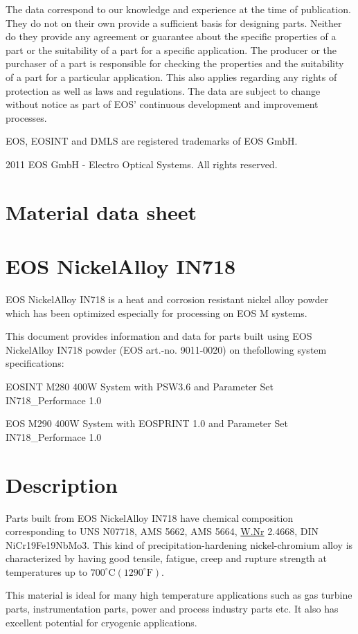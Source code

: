\documentclass[10pt]{article}
\begin{document}
The data correspond to our knowledge and experience at the time of publication. They do not on their own provide a sufficient basis for designing parts. Neither do they provide any agreement or guarantee about the specific properties of a part or the suitability of a part for a specific application. The producer or the purchaser of a part is responsible for checking the properties and the suitability of a part for a particular application. This also applies regarding any rights of protection as well as laws and regulations. The data are subject to change without notice as part of EOS' continuous development and improvement processes.

EOS, EOSINT and DMLS are registered trademarks of EOS GmbH.

2011 EOS GmbH - Electro Optical Systems. All rights reserved.

\section*{Material data sheet}
\section*{EOS NickelAlloy IN718}
EOS NickelAlloy IN718 is a heat and corrosion resistant nickel alloy powder which has been optimized especially for processing on EOS M systems.

This document provides information and data for parts built using EOS NickelAlloy IN718 powder (EOS art.-no. 9011-0020) on thefollowing system specifications:

EOSINT M280 400W System with PSW3.6 and Parameter Set IN718\_Performace 1.0

EOS M290 400W System with EOSPRINT 1.0 and Parameter Set IN718\_Performace 1.0

\section*{Description}
Parts built from EOS NickelAlloy IN718 have chemical composition corresponding to UNS N07718, AMS 5662, AMS 5664, \href{http://W.Nr}{W.Nr} 2.4668, DIN NiCr19Fe19NbMo3. This kind of precipitation-hardening nickel-chromium alloy is characterized by having good tensile, fatigue, creep and rupture strength at temperatures up to $700^{\circ} \mathrm{C}\left(1290^{\circ} \mathrm{F}\right)$.

This material is ideal for many high temperature applications such as gas turbine parts, instrumentation parts, power and process industry parts etc. It also has excellent potential for cryogenic applications.
\end{document}
